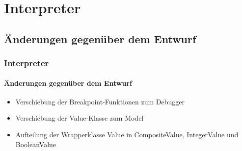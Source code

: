 \section{Interpreter}
\subsection{Änderungen gegenüber dem Entwurf}

\begin{frame}
\frametitle{Interpreter}
\framesubtitle{Änderungen gegenüber dem Entwurf}
\begin{itemize}
	\item Verschiebung der Breakpoint-Funktionen zum Debugger
	\item Verschiebung der Value-Klasse zum Model
	\item Aufteilung der Wrapperklasse Value in CompositeValue, IntegerValue und BooleanValue
\end{itemize}
\end{frame}

